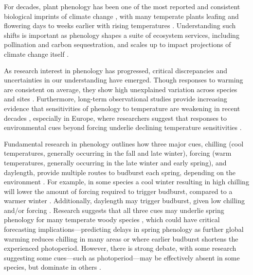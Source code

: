 \documentclass{article}
\begin{document}
\par For decades, plant phenology has been one of the most reported and consistent biological imprints of climate change \citep{IPCC:2014sm}, with many temperate plants leafing and flowering days to weeks earlier with rising temperatures \citep{millerrushing2008,menzel2006}. Understanding such shifts is important as phenology shapes a suite of ecosystem services, including pollination and carbon sequestration, and scales up to impact projections of climate change itself \cite{richardson2013}. %

\par As research interest in phenology has progressed, critical discrepancies and uncertainties in our understanding have emerged. Though responses to warming are consistent on average, they show high unexplained variation across species and sites \citep{Wolkovich:2012n}. Furthermore, long-term observational studies provide increasing evidence that sensitivities of phenology to temperature are weakening in recent decades \cite{Rutishauser:2008,yu2010}, especially in Europe, where researchers suggest that responses to environmental cues beyond forcing underlie declining temperature sensitivities \cite{fu2015}.

\par Fundamental research in phenology outlines how three major cues, chilling (cool temperatures, generally occurring in the fall and late winter), forcing (warm temperatures, generally occurring in the late winter and early spring), and daylength, provide multiple routes to budburst each spring, depending on the environment \citep{chuineJTB}. For example, in some species a cool winter resulting in high chilling will lower the amount of forcing required to trigger budburst, compared to a warmer winter \citep{harrington2015}. Additionally, daylength may trigger budburst, given low chilling and/or forcing \citep{Basler:2014aa, Caffarra:2011b, zohner2016}. Research suggests that all three cues may underlie spring phenology for many temperate woody species \citep{flynn2018,Basler:2014aa,Caffarra:2011qf}, which could have critical forecasting implications---predicting delays in spring phenology as further global warming reduces chilling in many areas \citep{fraga2019} or where earlier budburst shortens the experienced photoperiod. However, there is strong debate, with some research suggesting some cues---such as photoperiod---may be effectively absent in some species, but dominate in others \citep{zohner2016,koerner2010a}. 
\end{document}
